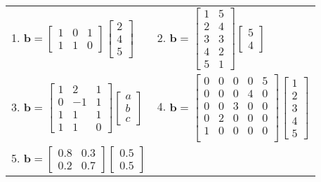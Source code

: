 	\begin{solution}
		\begin{table}[htbp]
			\centering
			\begin{tabular}{p{0.45\textwidth}p{}}
				1. $\boldsymbol{b}=\begin{bmatrix}
					1&0&1\\
					1&1&0
				\end{bmatrix}\begin{bmatrix}
					2\\4\\5
				\end{bmatrix}$ & 2. $\boldsymbol{b}=\begin{bmatrix}
				1&5\\2&4\\3&3\\4&2\\5&1
				\end{bmatrix}\begin{bmatrix}
				5\\4
				\end{bmatrix}$\\
				3.  $\boldsymbol{b}=\begin{bmatrix}
					1&2&1\\0&-1&1\\1&1&1\\1&1&0
				\end{bmatrix}\begin{bmatrix}
					a\\b\\c
				\end{bmatrix}$ & 4.  $\boldsymbol{b}=\begin{bmatrix}
				0&0&0&0&5\\
				0&0&0&4&0\\
				0&0&3&0&0\\
				0&2&0&0&0\\
				1&0&0&0&0\\
				\end{bmatrix}\begin{bmatrix}
				1\\2\\3\\4\\5
				\end{bmatrix}$\\
				5. $\boldsymbol{b}=\begin{bmatrix}
					0.8&0.3\\
					0.2&0.7
				\end{bmatrix}\begin{bmatrix}
					0.5\\0.5
				\end{bmatrix}$
			\end{tabular}
		\end{table}
	\end{solution}
	
